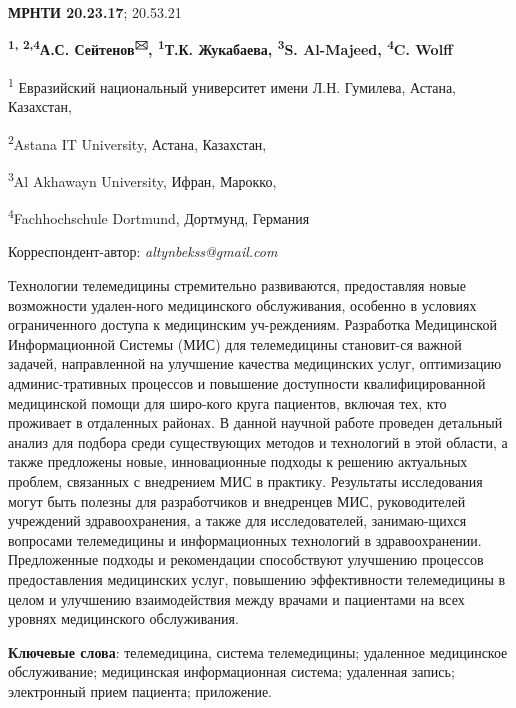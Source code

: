 
\newpage
{\bfseries МРНТИ 20.23.17}; 20.53.21


\begin{center}

{\bfseries \textsuperscript{1, 2,4}А.С. Сейтенов\textsuperscript{🖂},
\textsuperscript{1}Т.К. Жукабаева, \textsuperscript{3}S. Al-Majeed,
\textsuperscript{4}C. Wolff}

\textsuperscript{1} Евразийский национальный университет имени Л.Н.
Гумилева, Астана, Казахстан,

\textsuperscript{2}Astana IT University, Астана, Казахстан,

\textsuperscript{3}Al Akhawayn University, Ифран, Марокко,

\textsuperscript{4}Fachhochschule Dortmund, Дортмунд, Германия
\end{center}
Корреспондент-автор: \emph{altynbekss@gmail.com}


Технологии телемедицины стремительно развиваются, предоставляя новые
возможности удален-ного медицинского обслуживания, особенно в условиях
ограниченного доступа к медицинским уч-реждениям. Разработка Медицинской
Информационной Системы (МИС) для телемедицины становит-ся важной задачей,
направленной на улучшение качества медицинских услуг, оптимизацию
админис-тративных процессов и повышение доступности квалифицированной
медицинской помощи для широ-кого круга пациентов, включая тех, кто
проживает в отдаленных районах. В данной научной работе проведен
детальный анализ для подбора среди существующих методов и технологий в
этой области, а также предложены новые, инновационные подходы к решению
актуальных проблем, связанных с внедрением МИС в практику. Результаты
исследования могут быть полезны для разработчиков и внедренцев МИС,
руководителей учреждений здравоохранения, а также для исследователей,
занимаю-щихся вопросами телемедицины и информационных технологий в
здравоохранении. Предложенные подходы и рекомендации способствуют
улучшению процессов предоставления медицинских услуг, повышению
эффективности телемедицины в целом и улучшению взаимодействия между
врачами и пациентами на всех уровнях медицинского обслуживания.

{\bfseries Ключевые слова}: телемедицина, система телемедицины; удаленное
медицинское обслуживание; медицинская информационная система; удаленная
запись; электронный прием пациента; приложение.


